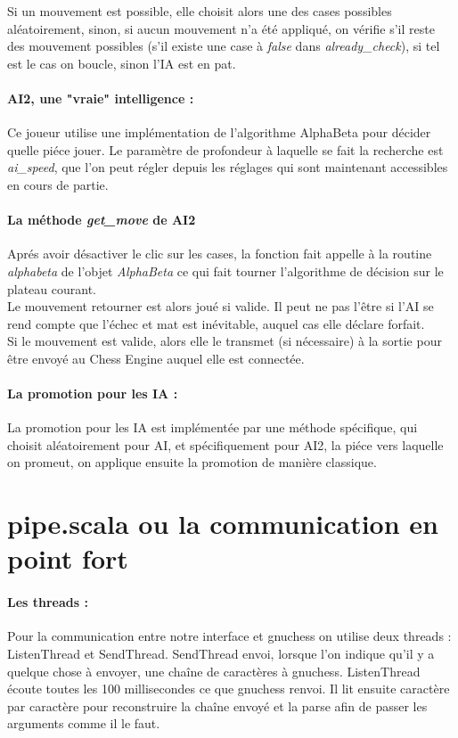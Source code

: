 \documentclass[a4paper]{article}
\begin{document}
Si un mouvement est possible, elle choisit alors une des cases possibles aléatoirement, sinon, si aucun mouvement n'a été appliqué, on vérifie s'il reste des mouvement possibles (s'il existe une case à \textit{false} dans \textit{already\_check}), si tel est le cas on boucle, sinon l'IA est en pat. 

\paragraph{AI2, une "vraie" intelligence :}Ce joueur utilise une implémentation de l'algorithme AlphaBeta pour décider quelle piéce jouer. Le paramètre de profondeur à laquelle se fait la recherche est \textit{ai\_speed}, que l'on peut régler depuis les réglages qui sont maintenant accessibles en cours de partie.

\paragraph{La méthode \textit{get\_move} de AI2} Aprés avoir désactiver le clic sur les cases, la fonction fait appelle à la routine \textit{alphabeta} de l'objet \textit{AlphaBeta} ce qui fait tourner l'algorithme de décision sur le plateau courant.\\
Le mouvement retourner est alors joué si valide. Il peut ne pas l'être si l'AI se rend compte que l'échec et mat est inévitable, auquel cas elle déclare forfait.\\
Si le mouvement est valide, alors elle le transmet (si nécessaire) à la sortie pour être envoyé au Chess Engine auquel elle est connectée.
  

\paragraph{La promotion pour les IA :}La promotion pour les IA est implémentée par une méthode spécifique, qui choisit aléatoirement pour AI, et spécifiquement pour AI2, la piéce vers laquelle on promeut, on applique ensuite la promotion de manière classique.

\section{pipe.scala ou la communication en point fort}

\paragraph{Les threads :}Pour la communication entre notre interface et gnuchess on utilise deux threads : ListenThread et SendThread. SendThread envoi, lorsque l'on indique qu'il y a quelque chose à envoyer, une chaîne de caractères à gnuchess. ListenThread écoute toutes les 100 millisecondes ce que gnuchess renvoi. Il lit ensuite caractère par caractère pour reconstruire la chaîne envoyé et la parse afin de passer les arguments comme il le faut. 
\end{document}
